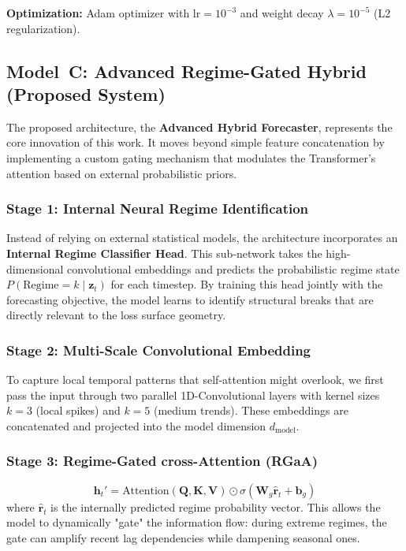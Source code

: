 \documentclass[conference, 10pt]{IEEEtran}
\begin{document}
\textbf{Optimization:} Adam optimizer with $\text{lr} = 10^{-3}$ and weight decay $\lambda = 10^{-5}$ (L2 regularization).

\subsection{Model~C: Advanced Regime-Gated Hybrid (Proposed System)}

The proposed architecture, the \textbf{Advanced Hybrid Forecaster}, represents the core innovation of this work. It moves beyond simple feature concatenation by implementing a custom gating mechanism that modulates the Transformer's attention based on external probabilistic priors.

\subsubsection{Stage 1: Internal Neural Regime Identification}

Instead of relying on external statistical models, the architecture incorporates an \textbf{Internal Regime Classifier Head}. This sub-network takes the high-dimensional convolutional embeddings and predicts the probabilistic regime state $P(\text{Regime} = k \mid \mathbf{z}_t)$ for each timestep. By training this head jointly with the forecasting objective, the model learns to identify structural breaks that are directly relevant to the loss surface geometry.

\subsubsection{Stage 2: Multi-Scale Convolutional Embedding}

To capture local temporal patterns that self-attention might overlook, we first pass the input through two parallel 1D-Convolutional layers with kernel sizes $k=3$ (local spikes) and $k=5$ (medium trends). These embeddings are concatenated and projected into the model dimension $d_\text{model}$.

\subsubsection{Stage 3: Regime-Gated cross-Attention (RGaA)}

\begin{equation}
\mathbf{h}_t' = \text{Attention}(\mathbf{Q}, \mathbf{K}, \mathbf{V}) \odot \sigma(\mathbf{W}_g \hat{\mathbf{r}}_t + \mathbf{b}_g)
\end{equation}
where $\hat{\mathbf{r}}_t$ is the internally predicted regime probability vector. This allows the model to dynamically "gate" the information flow: during extreme regimes, the gate can amplify recent lag dependencies while dampening seasonal ones.
\end{document}
